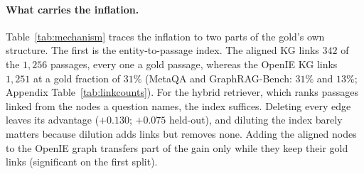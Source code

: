 \documentclass[11pt]{article}
\begin{document}
\begin{table}[t]\centering\footnotesize
\setlength{\tabcolsep}{2.6pt}
\caption{What carries the inflation. Paired hit@5 difference against the independent OpenIE KG on the first 2WikiMultiHop split (last row: MetaQA), with the gold fraction of the passages the structure links to. Exact sign test, $^{*}p<0.05$, $^{**}p<0.01$. Held-out split and CIs in Appendices~\ref{app:swaprobust}, \ref{app:concentration}, and~\ref{app:hipporag2}.}
\label{tab:mechanism}
\end{table}

\paragraph{What carries the inflation.} Table~\ref{tab:mechanism} traces the inflation to two parts of the gold's own structure. The first is the entity-to-passage index. The aligned KG links $342$ of the $1{,}256$ passages, every one a gold passage, whereas the OpenIE KG links $1{,}251$ at a gold fraction of $31\%$ (MetaQA and GraphRAG-Bench: $31\%$ and $13\%$; Appendix Table~\ref{tab:linkcounts}). For the hybrid retriever, which ranks passages linked from the nodes a question names, the index suffices. Deleting every edge leaves its advantage ($+0.130$; $+0.075$ held-out), and diluting the index barely matters because dilution adds links but removes none. Adding the aligned nodes to the OpenIE graph transfers part of the gain only while they keep their gold links (significant on the first split).
\end{document}
